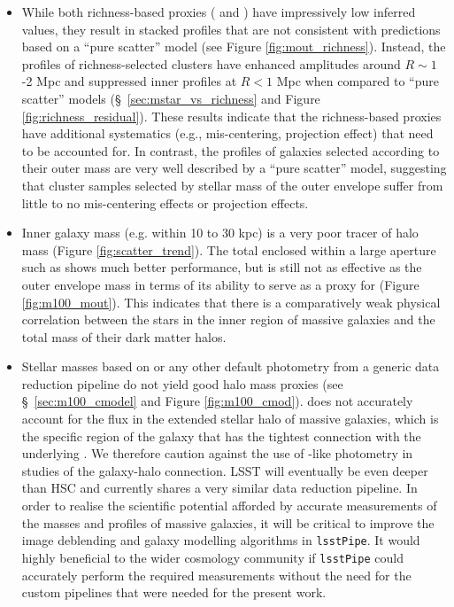 \documentclass[fleqn,usenatbib,useAMS]{mnras}
\begin{document}
\begin{CJK*}{UTF8}{gbsn}
\begin{itemize}
        \item While both richness-based \mvir{} proxies (\redm{} and \camira{}) have
            impressively low inferred \sigmvir{} values, they result in stacked \dsigma{} profiles
            that are not consistent with predictions based on a ``pure scatter'' model (see Figure
            \ref{fig:mout_richness}).
            Instead, the \dsigma{} profiles of richness-selected clusters have enhanced amplitudes
            around $R\sim 1$-2 Mpc and suppressed inner profiles at $R < 1$ Mpc when compared to
            ``pure scatter'' models (\S\ \ref{sec:mstar_vs_richness} and Figure
            \ref{fig:richness_residual}).
            These results indicate that the richness-based \mvir{} proxies have additional
            systematics (e.g., mis-centering, projection effect) that need to be accounted for. 
            In contrast, the \dsigma{} profiles of galaxies selected according to their outer mass
            are very well described by a ``pure scatter'' model, suggesting that cluster samples
            selected by stellar mass of the outer envelope suffer from little to no mis-centering
            effects or projection effects.
            
        \item Inner galaxy mass (e.g. \mstar{} within 10 to 30 kpc) is a very poor tracer of halo
            mass (Figure \ref{fig:scatter_trend}).
            The total \mstar{} enclosed within a large aperture such as  shows much
            better performance, but is still not as effective as the outer envelope mass in terms of
            its ability to serve as a proxy for \mvir{} (Figure \ref{fig:m100_mout}).
            This indicates that there is a comparatively weak physical correlation between the stars
            in the inner region of massive galaxies and the total mass of their dark matter halos. 
        
        \item Stellar masses based on \cmodel{} or any other default photometry from a generic data
            reduction pipeline do not yield good halo mass proxies (see \S\ \ref{sec:m100_cmodel}
            and Figure \ref{fig:m100_cmod}).
            \cmodel{} does not accurately account for the flux in the extended stellar halo of
            massive galaxies, which is the specific region of the galaxy that has the tightest
            connection with the underlying \mvir{}.
            We therefore caution against the use of \cmodel{}-like photometry in studies of the
            galaxy-halo connection. 
            LSST will eventually be even deeper than HSC and currently shares a very similar data
            reduction pipeline. 
            In order to realise the scientific potential afforded by accurate measurements of the
            masses and profiles of massive galaxies, it will be critical to improve the image
            deblending and galaxy modelling algorithms in \texttt{lsstPipe}. 
            It would highly beneficial to the wider cosmology community if \texttt{lsstPipe} could
            accurately perform the required measurements without the need for the custom pipelines
            that were needed for the present work.


\end{itemize}
\end{CJK*}
\end{document}
